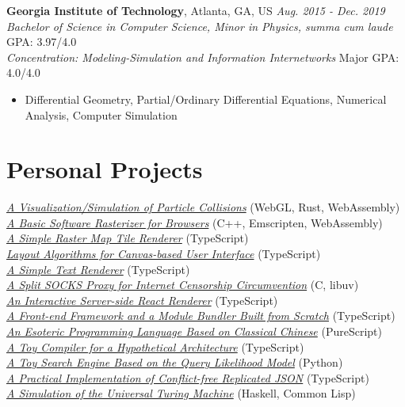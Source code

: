 \documentclass[11pt]{article}
\begin{document}
\textbf{Georgia Institute of Technology}, Atlanta, GA, US \hfill \textit{Aug. 2015 - Dec. 2019}\\
\textit{Bachelor of Science in Computer Science, Minor in Physics, \textit{summa cum laude}} \hfill GPA: 3.97/4.0\\
\textit{Concentration: Modeling-Simulation and Information Internetworks} \hfill Major GPA: 4.0/4.0
\begin{itemize}
\small
\item Differential Geometry, Partial/Ordinary Differential Equations, Numerical Analysis, Computer Simulation
\end{itemize}

\section*{Personal Projects}
\href{https://github.com/galmungral/particle-simulation}{\textit{A Visualization/Simulation of Particle Collisions}} \hfill (WebGL, Rust, WebAssembly) \\
\href{https://github.com/galmungral/rasterizer}{\textit{A Basic Software Rasterizer for Browsers}} \hfill (C++, Emscripten, WebAssembly) \\
\href{https://github.com/galmungral/mercator}{\textit{A Simple Raster Map Tile Renderer}} \hfill (TypeScript) \\
\href{https://github.com/galmungral/michelangelo}{\textit{Layout Algorithms for Canvas-based User Interface}} \hfill (TypeScript) \\
\href{https://github.com/galmungral/text2svg}{\textit{A Simple Text Renderer}} \hfill (TypeScript) \\
\href{https://github.com/galmungral/telescope}{\textit{A Split SOCKS Proxy for Internet Censorship Circumvention}} \hfill (C, libuv) \\
\href{https://github.com/galmungral/react-teletype}{\textit{An Interactive Server-side React Renderer}} \hfill (TypeScript) \\
\href{https://github.com/galmungral/replay}{\textit{A Front-end Framework and a Module Bundler Built from Scratch}} \hfill (TypeScript) \\
\href{https://github.com/galmungral/hanbun-lang}{\textit{An Esoteric Programming Language Based on Classical Chinese}} \hfill (PureScript) \\
\href{https://github.com/galmungral/sketchpad}{\textit{A Toy Compiler for a Hypothetical Architecture}} \hfill (TypeScript) \\
\href{https://github.com/galmungral/plato}{\textit{A Toy Search Engine Based on the Query Likelihood Model}} \hfill (Python) \\
\href{https://github.com/galmungral/json-crdt}{\textit{A Practical Implementation of Conflict-free Replicated JSON}} \hfill (TypeScript) \\
\href{https://github.com/galmungral/turing-machine}{\textit{A Simulation of the Universal Turing Machine}} \hfill (Haskell, Common Lisp)
\end{document}
